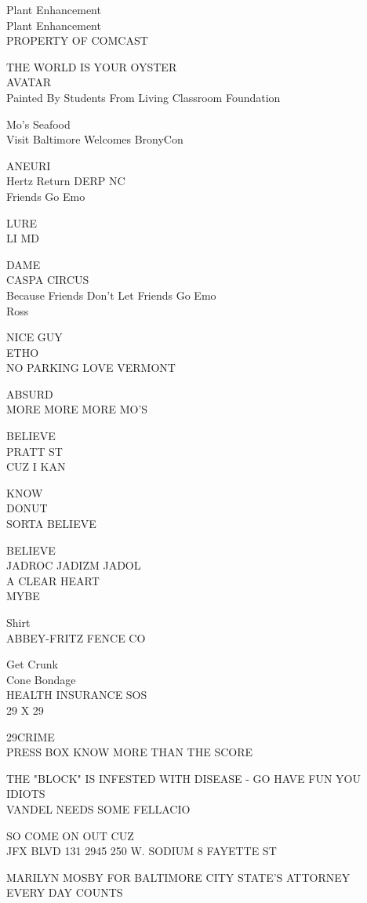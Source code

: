\documentclass[10pt,letterpaper]{article}
\begin{document}
Plant Enhancement\\
Plant Enhancement\\
PROPERTY OF COMCAST

THE WORLD IS YOUR OYSTER\\
AVATAR\\
Painted By Students From Living Classroom Foundation

Mo's Seafood\\
Visit Baltimore Welcomes BronyCon

ANEURI\\
Hertz Return DERP NC\\
Friends Go Emo

LURE\\
LI MD

DAME\\
CASPA CIRCUS\\
Because Friends Don't Let Friends Go Emo\\
Ross

NICE GUY\\
ETHO\\
NO PARKING LOVE VERMONT

ABSURD\\
MORE MORE MORE MO'S

BELIEVE\\
PRATT ST\\
CUZ I KAN

KNOW\\
DONUT\\
SORTA BELIEVE

BELIEVE\\
JADROC JADIZM JADOL\\
A CLEAR HEART\\
MYBE

Shirt\\
ABBEY{-}FRITZ FENCE CO

Get Crunk\\
Cone Bondage\\
HEALTH INSURANCE SOS\\
29 X 29

29CRIME\\
PRESS BOX KNOW MORE THAN THE SCORE

THE "BLOCK" IS INFESTED WITH DISEASE {-} GO HAVE FUN YOU IDIOTS\\
VANDEL NEEDS SOME FELLACIO

SO COME ON OUT CUZ\\
JFX BLVD 131 2945 250 W. SODIUM 8 FAYETTE ST

MARILYN MOSBY FOR BALTIMORE CITY STATE'S ATTORNEY\\
EVERY DAY COUNTS
\end{document}
